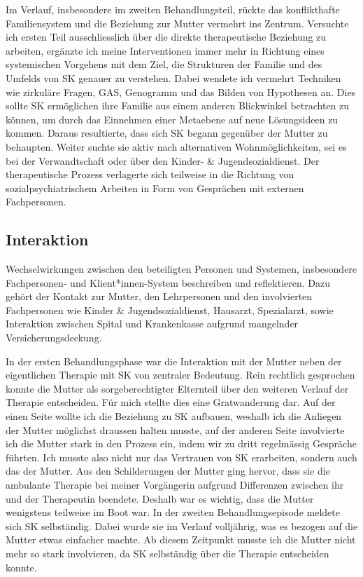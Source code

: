 Im Verlauf, insbesondere im zweiten Behandlungsteil, rückte das konflikthafte Familiensystem und die Beziehung zur Mutter vermehrt ins Zentrum. Versuchte ich ersten Teil ausschliesslich über die direkte therapeutische Beziehung zu arbeiten, ergänzte ich meine Interventionen immer mehr in Richtung eines systemischen Vorgehens mit dem Ziel, die Strukturen der Familie und des Umfelds von SK genauer zu verstehen. Dabei wendete ich vermehrt Techniken wie zirkuläre Fragen, GAS, Genogramm und das Bilden von Hypothesen an. Dies sollte SK ermöglichen ihre Familie aus einem anderen Blickwinkel betrachten zu können, um durch das Einnehmen einer Metaebene auf neue Lösungsideen zu kommen. Daraus resultierte, dass sich SK begann gegenüber der Mutter zu behaupten. Weiter suchte sie aktiv nach alternativen Wohnmöglichkeiten, sei es bei der Verwandtschaft oder über den Kinder- \& Jugendsozialdienst. Der therapeutische Prozess verlagerte sich teilweise in die Richtung von sozialpsychiatrischem Arbeiten in Form von Gesprächen mit externen Fachpersonen. 


\subsection{Interaktion} \label{sc:interaktion}
Wechselwirkungen zwischen den beteiligten Personen und Systemen, insbesondere Fachpersonen- und Klient*innen-System beschreiben und reflektieren. Dazu gehört der Kontakt zur Mutter, den Lehrpersonen und den involvierten Fachpersonen wie Kinder \& Jugendsozialdienst, Hausarzt, Spezialarzt, sowie Interaktion zwischen Spital und Krankenkasse aufgrund mangelnder Versicherungsdeckung.

In der ersten Behandlungsphase war die Interaktion mit der Mutter neben der eigentlichen Therapie mit SK von zentraler Bedeutung. Rein rechtlich gesprochen konnte die Mutter als sorgeberechtigter Elternteil über den weiteren Verlauf der Therapie entscheiden. Für mich stellte dies eine Gratwanderung dar. Auf der einen Seite wollte ich die Beziehung zu SK aufbauen, weshalb ich die Anliegen der Mutter möglichst draussen halten musste, auf der anderen Seite involvierte ich die Mutter stark in den Prozess ein, indem wir zu dritt regelmässig Gespräche führten. Ich musste also nicht nur das Vertrauen von SK erarbeiten, sondern auch das der Mutter. Aus den Schilderungen der Mutter ging hervor, dass sie die ambulante Therapie bei meiner Vorgängerin aufgrund Differenzen zwischen ihr und der Therapeutin beendete. Deshalb war es wichtig, dass die Mutter wenigstens teilweise im Boot war. In der zweiten Behandlungsepisode meldete sich SK selbständig. Dabei wurde sie im Verlauf volljährig, was es bezogen auf die Mutter etwas einfacher machte. Ab diesem Zeitpunkt musste ich die Mutter nicht mehr so stark involvieren, da SK selbständig über die Therapie entscheiden konnte. 


